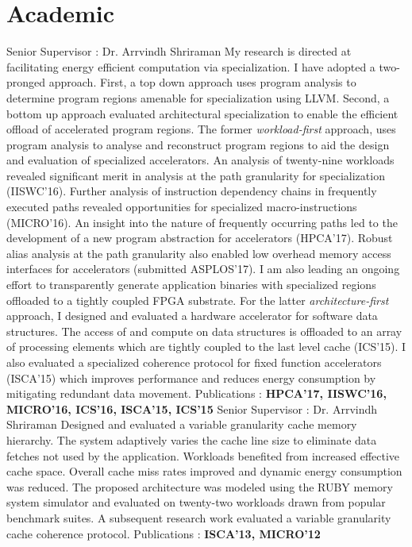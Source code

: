 
\section{Academic}
{Senior Supervisor : Dr. Arrvindh Shriraman \newline{} 
My research is directed at facilitating energy efficient computation via specialization. I have adopted a two-pronged approach. First, a top down approach uses program analysis to determine program regions amenable for specialization using LLVM. Second, a bottom up approach evaluated architectural specialization to enable the efficient offload of accelerated program regions.
\newline{}The former {\em workload-first} approach, uses program analysis to analyse and reconstruct program regions to aid the design and evaluation of specialized accelerators. An analysis of twenty-nine workloads revealed significant merit in analysis at the path granularity for specialization (IISWC'16). Further analysis of instruction dependency chains in frequently executed paths revealed opportunities for specialized macro-instructions (MICRO'16). An insight into the nature of frequently occurring paths led to the development of a new program abstraction for accelerators (HPCA'17). Robust alias analysis at the path granularity also enabled low overhead memory access interfaces for accelerators (submitted ASPLOS'17). I am also leading an ongoing effort to transparently generate application binaries with specialized regions offloaded to a tightly coupled FPGA substrate.
\newline{}For the latter {\em architecture-first} approach, I designed and evaluated a hardware accelerator for software data structures. The access of and compute on data structures is offloaded to an array of processing elements which are tightly coupled to the last level cache (ICS'15). I also evaluated a specialized coherence protocol for fixed function accelerators (ISCA'15) which improves performance and reduces energy consumption by mitigating redundant data movement.
\newline{} Publications : \textbf{HPCA'17, IISWC'16, MICRO'16, ICS'16, ISCA'15, ICS'15}}
\vspace{9pt}
{Senior Supervisor : Dr. Arrvindh Shriraman \newline{} 
Designed and evaluated a variable granularity cache memory hierarchy. The system adaptively varies the cache line size to eliminate data fetches not used by the application. Workloads benefited from increased effective cache space. Overall cache miss rates improved and dynamic energy consumption was reduced. The proposed architecture was modeled using the RUBY memory system simulator and evaluated on twenty-two workloads drawn from popular benchmark suites. A subsequent research work evaluated a variable granularity cache coherence protocol.
\newline{} Publications : \textbf{ISCA'13, MICRO'12}}
